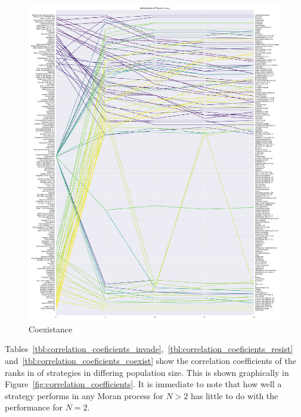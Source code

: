 \documentclass{article}
\begin{document}
\begin{figure}[!hbtp]
    \centering
    \includegraphics[height=.9\textheight]{../img/median_rank_vs_population_size_coexist.pdf}
    \caption{Coexistance}
    \label{fig:ranks_v_size_coexist}
\end{figure}

Tables~\ref{tbl:correlation_coeficients_invade},~\ref{tbl:correlation_coeficients_resist}
and~\ref{tbl:correlation_coeficients_coexist} show the correlation coefficients
of the ranks in of strategies in differing population size. This is shown
graphically in Figure~\ref{fig:correlation_coefficients}. It is immediate to
note that how well a strategy performs in any Moran process for \(N>2\) has
little to do with the performance for \(N=2\).
\end{document}

